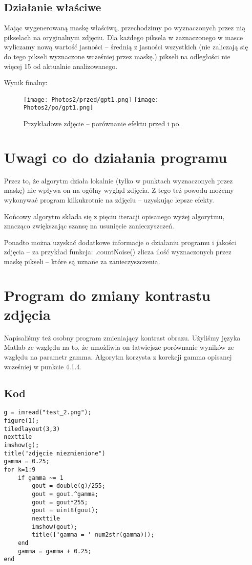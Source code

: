 \documentclass[]{mwart}
\begin{document}
\newpage
\subsection{Działanie właściwe}
Mając wygenerowaną maskę właściwą, przechodzimy po wyznaczonych
przez nią pikselach na oryginalnym zdjęciu. Dla każdego piksela w
zaznaczonego w masce wyliczamy nową wartość jasności -- średnią z
jasności wszystkich (nie zaliczają się do tego pikseli wyznaczone
wcześniej przez maskę.) pikseli na odległości nie więcej 15 od aktualnie analizowanego.

Wynik finalny:
\begin{figure}[H]
    \centering
    \texttt{[image: Photos2/przed/gpt1.png]}
    \texttt{[image: Photos2/po/gpt1.png]}
    \caption{Przykładowe zdjęcie -- porównanie efektu przed i po.}

\end{figure}

\newpage
\section{Uwagi co do działania programu}
Przez to, że algorytm działa lokalnie (tylko w punktach wyznaczonych
przez maskę) nie wpływa on na ogólny wygląd zdjęcia.
Z tego też powodu możemy wykonywać program kilkukrotnie na zdjęciu
-- uzyskując lepsze efekty.

Końcowy algorytm składa się z pięciu iteracji opisanego wyżej algorytmu,
znacząco zwiększając szansę na usunięcie zanieczyszczeń.

Ponadto można uzyskać dodatkowe informacje o działaniu programu
i jakości zdjęcia -- za przykład funkcja: .countNoise()
zlicza ilość wyznaczonych przez maskę pikseli -- które są uznane za zanieczyszczenia.


\section{Program do zmiany kontrastu zdjęcia}
Napisaliśmy też osobny program zmieniający kontrast obrazu.
Użyliśmy języka Matlab ze względu na to, że umożliwia on łatwiejsze porównanie wyników ze względu na parametr gamma.
Algorytm korzysta z korekcji gamma opisanej wcześniej w punkcie 4.1.4.

\subsection{Kod}
\begin{verbatim}
g = imread("test_2.png");
figure(1);
tiledlayout(3,3)
nexttile
imshow(g);
title("zdjęcie niezmienione")
gamma = 0.25;
for k=1:9
    if gamma ~= 1
        gout = double(g)/255;
        gout = gout.^gamma;
        gout = gout*255;
        gout = uint8(gout);
        nexttile
        imshow(gout);
        title(['gamma = ' num2str(gamma)]);
    end
    gamma = gamma + 0.25;
end
\end{verbatim}
\end{document}
